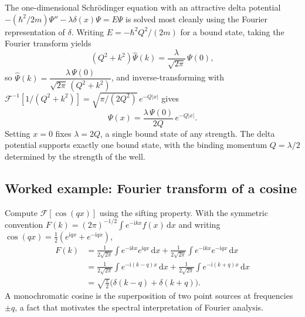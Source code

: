 The one-dimensional Schr\"odinger equation with an attractive delta potential $-(\hbar^2/2m)\Psi''-\lambda\delta(x)\Psi=E\Psi$ is solved most cleanly using the Fourier representation of $\delta$. Writing $E=-\hbar^2Q^2/(2m)$ for a bound state, taking the Fourier transform yields
\begin{equation}
(Q^2+k^2)\widehat{\Psi}(k)=\frac{\lambda}{\sqrt{2\pi}}\,\Psi(0),
\end{equation}
so $\widehat{\Psi}(k)=\dfrac{\lambda\,\Psi(0)}{\sqrt{2\pi}\,(Q^2+k^2)}$, and inverse-transforming with $\mathcal{F}^{-1}[1/(Q^2+k^2)]=\sqrt{\pi/(2Q^2)}\,e^{-Q|x|}$ gives
\begin{equation}
\Psi(x)=\frac{\lambda\,\Psi(0)}{2Q}\,e^{-Q|x|}.
\end{equation}
Setting $x=0$ fixes $\lambda=2Q$, a single bound state of any strength. The delta potential supports exactly one bound state, with the binding momentum $Q=\lambda/2$ determined by the strength of the well.

\subsection{Worked example: Fourier transform of a cosine}

Compute $\mathcal{F}[\cos(qx)]$ using the sifting property. With the symmetric convention $F(k)=(2\pi)^{-1/2}\int e^{-\mathrm{i}kx}f(x)\,\mathrm{d}x$ and writing $\cos(qx)=\tfrac12(e^{\mathrm{i}qx}+e^{-\mathrm{i}qx})$,
\begin{align}
F(k)&=\frac{1}{2\sqrt{2\pi}}\int e^{-\mathrm{i}kx}e^{\mathrm{i}qx}\,\mathrm{d}x+\frac{1}{2\sqrt{2\pi}}\int e^{-\mathrm{i}kx}e^{-\mathrm{i}qx}\,\mathrm{d}x\\
&=\frac{1}{2\sqrt{2\pi}}\!\int\!e^{-\mathrm{i}(k-q)x}\,\mathrm{d}x+\frac{1}{2\sqrt{2\pi}}\!\int\!e^{-\mathrm{i}(k+q)x}\,\mathrm{d}x\\
&=\sqrt{\frac{\pi}{2}}\bigl(\delta(k-q)+\delta(k+q)\bigr).
\end{align}
A monochromatic cosine is the superposition of two point sources at frequencies $\pm q$, a fact that motivates the spectral interpretation of Fourier analysis.